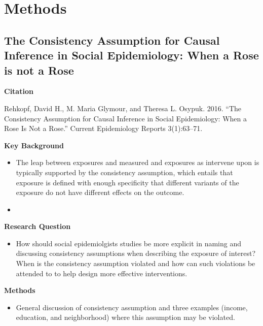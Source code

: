 \documentclass[
]{book}
\providecommand{\tightlist}{%
  \setlength{\itemsep}{0pt}\setlength{\parskip}{0pt}}
\begin{document}
\hypertarget{methods}{%
\section{Methods}\label{methods}}

\hypertarget{the-consistency-assumption-for-causal-inference-in-social-epidemiology-when-a-rose-is-not-a-rose}{%
\subsection{The Consistency Assumption for Causal Inference in Social Epidemiology: When a Rose is not a Rose}\label{the-consistency-assumption-for-causal-inference-in-social-epidemiology-when-a-rose-is-not-a-rose}}

\textbf{Citation}

Rehkopf, David H., M. Maria Glymour, and Theresa L. Osypuk. 2016. ``The Consistency Assumption for Causal Inference in Social Epidemiology: When a Rose Is Not a Rose.'' Current Epidemiology Reports 3(1):63--71.

\textbf{Key Background}

\begin{itemize}
\item
  The leap between exposures and measured and exposures as intervene upon is typically supported by the consistency assumption, which entails that exposure is defined with enough specificity that different variants of the exposure do not have different effects on the outcome.
\item
\end{itemize}

\textbf{Research Question}

\begin{itemize}
\tightlist
\item
  How should social epidemiolgists studies be more explicit in naming and discussing consistency assumptions when describing the exposure of interest? When is the consistency assumption violated and how can such violations be attended to to help design more effective interventions.
\end{itemize}

\textbf{Methods}

\begin{itemize}
\tightlist
\item
  General discussion of consistency assumption and three examples (income, education, and neighborhood) where this assumption may be violated.
\end{itemize}
\end{document}
